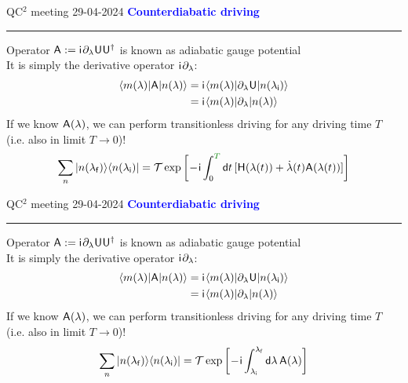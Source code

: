 \documentclass{beamer}
\def\gemph#1{{\color{mygreen}#1}}
\def\lbt{\small QC$^2$ meeting 29-04-2024} %
\def\mt#1{\kern0.025em\mathsf{#1}\kern0.025em}
\def\d{\mathsf d}
\def\i{\mathsf i}
\def\lambdai{{\lambda_{\sf i}}}
\def\lambdaf{{\lambda_{\sf f}}}
\def\A{\mt A}
\def\+{\kern0.0833em}
\newenvironment{dia}[2]
{
	\begin{frame}
	\vspace{1mm}
	{\small #1}
	\hfill
    {\small\bf\textcolor{blue}{#2}}
	\vspace{3mm}
	\hrule
	\bigskip
}
{
	\vfill
	\end{frame}
}
\begin{document}
\begin{dia}{\lbt}{Counterdiabatic driving}
Operator $\A := \i \+ \partial_\lambda \mt U \mt U\t$ is known as \gemph{adiabatic gauge potential} \pause \\[4mm]
It is simply the derivative operator $\i \+ \partial_\lambda$:
\begin{align*}
    \bra{m(\lambda)} \mt A \ket{n(\lambda)} &= \i \+ \bra{m(\lambda)} \partial_\lambda \mt U \ket{n(\lambdai)} \\
    &= \i \+ \bra{m(\lambda)} \partial_\lambda \ket{n(\lambda)}
\end{align*} \pause
If we know $\A(\lambda)$, we can perform \gemph{transitionless} driving for \gemph{any driving time $T$} (i.e. also in limit $T\to0$)! \pause
\begin{align*}
    \sum_n \ket{n(\lambdaf)}\bra{n(\lambdai)} = \mathcal T\exp \bigg[ \!-\!\i \int_0^{{\color{mygreen}T}} \d t \, [\mt H(\lambda(t)) + \dot\lambda(t) \mt A(\lambda(t))] \bigg]
\end{align*}
\vspace{-1cm}
\end{dia}

\begin{dia}{\lbt}{Counterdiabatic driving}
Operator $\A := \i \+ \partial_\lambda \mt U \mt U\t$ is known as \gemph{adiabatic gauge potential} \\[4mm]
It is simply the derivative operator $\i \+ \partial_\lambda$:
\begin{align*}
    \bra{m(\lambda)} \mt A \ket{n(\lambda)} &= \i \+ \bra{m(\lambda)} \partial_\lambda \mt U \ket{n(\lambdai)} \\
    &= \i \+ \bra{m(\lambda)} \partial_\lambda \ket{n(\lambda)}
\end{align*}
If we know $\A(\lambda)$, we can perform \gemph{transitionless} driving for \gemph{any driving time $T$} (i.e. also in limit $T\to0$)!
\begin{align*}
    \sum_n \ket{n(\lambdaf)}\bra{n(\lambdai)} = \mathcal T\exp \bigg[ \!-\!\i \int_\lambdai^\lambdaf \d\lambda \, \mt A(\lambda) \bigg]
\end{align*}
\vspace{-1cm}
\end{dia}
\end{document}
